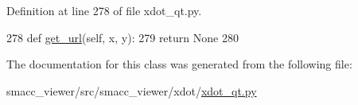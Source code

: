 Definition at line 278 of file xdot\+\_\+qt.\+py.


\begin{DoxyCode}
278     \textcolor{keyword}{def }\hyperlink{classsmacc__viewer_1_1xdot_1_1xdot__qt_1_1Element_ae2e828c1f21bbe2c50ce591ce00d33d3}{get\_url}(self, x, y):
279         \textcolor{keywordflow}{return} \textcolor{keywordtype}{None}
280 
\end{DoxyCode}


The documentation for this class was generated from the following file\+:\begin{DoxyCompactItemize}
\item 
smacc\+\_\+viewer/src/smacc\+\_\+viewer/xdot/\hyperlink{xdot__qt_8py}{xdot\+\_\+qt.\+py}\end{DoxyCompactItemize}
